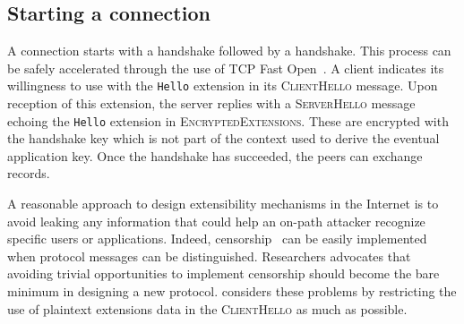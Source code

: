 \subsection{Starting a \tcpls connection}

A \tcpls connection starts with a \tcp handshake followed by a \tls handshake.
This process can be safely accelerated through the use of TCP Fast Open~\cite{rfc7413}.
A \tcpls client
indicates its willingness to use \tcpls with the \tcpls \texttt{Hello} extension
in its \tls \textsc{ClientHello} message. Upon reception of this extension, the \tcpls server
replies with a \tls \textsc{ServerHello} message echoing the \tcpls \texttt{Hello} extension in \tls \textsc{EncryptedExtensions}.
These are encrypted with the handshake key which is not part of the context used to derive the eventual
application key. 
Once the \tls handshake has succeeded, the peers can exchange \tcpls records.

A reasonable approach to design extensibility mechanisms in the Internet
is to avoid leaking any information that could help an on-path attacker
recognize specific users or applications. Indeed, censorship~\cite{Morshed2017a,
	Gosain2017a,Chai2019a} can be easily implemented when protocol messages can be
distinguished. Researchers advocates that avoiding trivial opportunities to
implement censorship should become the bare minimum in designing a new protocol.
\tcpls%
considers these problems by restricting the use of
plaintext extensions data in the \textsc{ClientHello} as much as possible.



